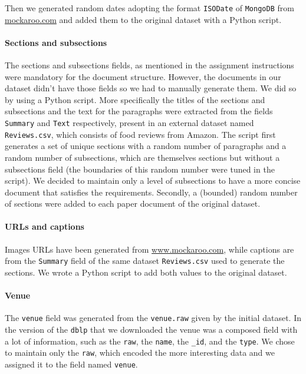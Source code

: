 Then we generated random dates adopting the format \verb|ISODate| of \verb|MongoDB| from \href{https://www.mockaroo.com}{mockaroo.com} and added them to the original dataset with a Python script.

\paragraph{Sections and subsections}
The sections and subsections fields, as mentioned in the assignment instructions were mandatory for the document structure.
However, the documents in our dataset didn't have those fields so we had to manually generate them.
We did so by using a Python script.
More specifically the titles of the sections and subsections and the text for the paragraphs were extracted from the fields \verb|Summary| and \verb|Text| respectively, present in an external dataset named \verb|Reviews.csv|\footnotemark{}, which consists of food reviews from Amazon.
The script first generates a set of unique sections with a random number of paragraphs and a random number of subsections, which are themselves sections but without a subsections field (the boundaries of this random number were tuned in the script).
We decided to maintain only a level of subsections to have a more concise document that satisfies the requirements.
Secondly, a (bounded) random number of sections were added to each paper document of the original dataset.

\paragraph{URLs and captions} Images URLs have been generated from \href{https://www.mockaroo.com}{www.mockaroo.com}, while captions are from the \verb|Summary| field of the same dataset \verb|Reviews.csv| used to generate the sections.
We wrote a Python script to add both values to the original dataset.

\paragraph{Venue} The \verb|venue| field was generated from the \verb|venue.raw| given by the initial dataset.
In the version of the \verb|dblp| that we downloaded the venue was a composed field with a lot of information, such as the \verb|raw|, the \verb|name|, the \verb|_id|, and the \verb|type|.
We chose to maintain only the \verb|raw|, which encoded the more interesting data and we assigned it to the field named \verb|venue|.


